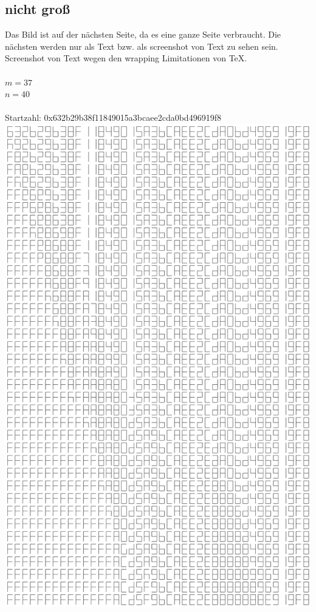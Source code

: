 \documentclass[a4paper,10pt,ngerman]{scrartcl}
\begin{document}
\subsection{nicht groß}

Das Bild ist auf der nächsten Seite, da es eine ganze Seite verbraucht. Die nächsten werden nur als Text bzw. als screenshot von Text zu sehen sein. Screenshot von Text wegen den wrapping Limitationen von \TeX.
\\
\\
$m=37$
\\
$n=40$
\\
\\
Startzahl: 0x632b29b38f11849015a3bcaee2cda0bd496919f8
\newpage
\noindent \includegraphics[scale=.4]{solutions/hexmax2.png} 
\end{document}
